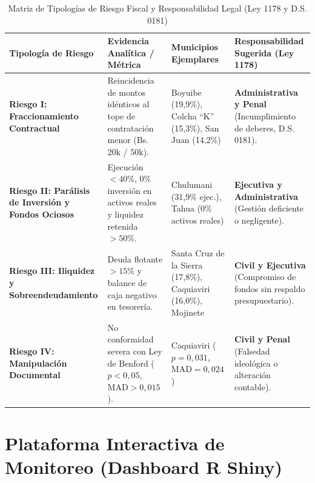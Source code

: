 \documentclass[11pt,a4paper]{article}
\begin{document}
\begin{table}[htbp]
\centering
\small
\caption{Matriz de Tipologías de Riesgo Fiscal y Responsabilidad Legal (Ley 1178 y D.S. 0181)}
\label{tab:matriz_riesgos_safco}
\begin{tabularx}{\textwidth}{p{3.2cm}p{4.2cm}p{3.5cm}X}
\hline
\textbf{Tipología de Riesgo} & \textbf{Evidencia Analítica / Métrica} & \textbf{Municipios Ejemplares} & \textbf{Responsabilidad Sugerida (Ley 1178)} \\
\hline
\textbf{Riesgo I: Fraccionamiento Contractual} & Reincidencia de montos idénticos al tope de contratación menor (Bs. 20k / 50k). & Boyuibe (19,9\%), Colcha ``K'' (15,3\%), San Juan (14,2\%) & \textbf{Administrativa y Penal} (Incumplimiento de deberes, D.S. 0181). \\
\textbf{Riesgo II: Parálisis de Inversión y Fondos Ociosos} & Ejecución $< 40\%$, $0\%$ inversión en activos reales y liquidez retenida $> 50\%$. & Chulumani (31,9\% ejec.), Tahua (0\% activos reales) & \textbf{Ejecutiva y Administrativa} (Gestión deficiente o negligente). \\
\textbf{Riesgo III: Iliquidez y Sobreendeudamiento} & Deuda flotante $> 15\%$ y balance de caja negativo en tesorería. & Santa Cruz de la Sierra (17,8\%), Caquiaviri (16,0\%), Mojinete & \textbf{Civil y Ejecutiva} (Compromiso de fondos sin respaldo presupuestario). \\
\textbf{Riesgo IV: Manipulación Documental} & No conformidad severa con Ley de Benford ($p < 0,05$, $\text{MAD} > 0,015$). & Caquiaviri ($p=0,031$, $\text{MAD}=0,024$) & \textbf{Civil y Penal} (Falsedad ideológica o alteración contable). \\
\hline
\end{tabularx}
\end{table}

\section{Plataforma Interactiva de Monitoreo (Dashboard R Shiny)}
\end{document}
